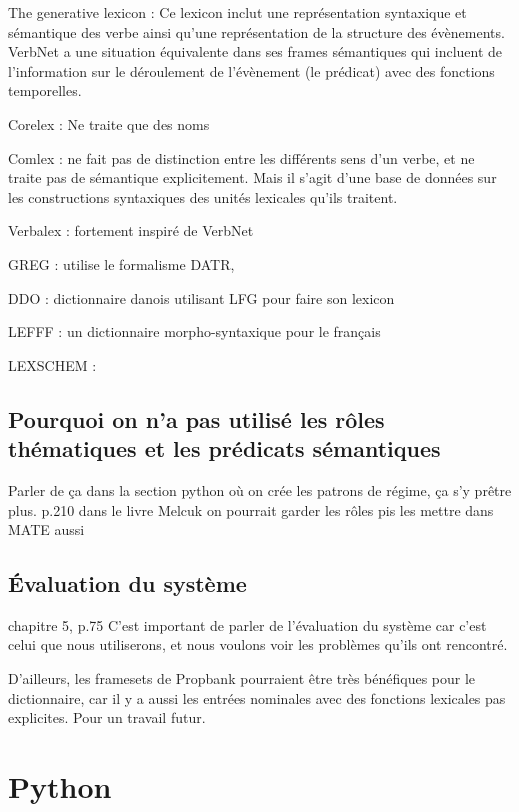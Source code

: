 The generative lexicon : Ce lexicon inclut une représentation syntaxique et sémantique des verbe ainsi qu'une représentation de la structure des évènements. VerbNet a une situation équivalente dans ses frames sémantiques qui incluent de l'information sur le déroulement de l'évènement (le prédicat) avec des fonctions temporelles.

Corelex : Ne traite que des noms

Comlex : ne fait pas de distinction entre les différents sens d'un verbe, et ne traite pas de sémantique explicitement. Mais il s'agit d'une base de données sur les constructions syntaxiques des unités lexicales qu'ils traitent.

Verbalex : fortement inspiré de VerbNet

GREG : utilise le formalisme DATR, 

DDO : dictionnaire danois utilisant LFG pour faire son lexicon

LEFFF : un dictionnaire morpho-syntaxique pour le français

LEXSCHEM :

\subsection{Pourquoi on n'a pas utilisé les rôles thématiques et les prédicats sémantiques}

Parler de ça dans la section python où on crée les patrons de régime, ça s'y prêtre plus.
p.210 dans le livre Melcuk
on pourrait garder les rôles pis les mettre dans MATE aussi

\subsection{Évaluation du système}
chapitre 5, p.75 C'est important de parler de l'évaluation du système car c'est celui que nous utiliserons, et nous voulons voir les problèmes qu'ils ont rencontré.

D'ailleurs, les framesets de Propbank pourraient être très bénéfiques pour le dictionnaire, car il y a aussi les entrées nominales avec des fonctions lexicales pas explicites. Pour un travail futur.


\section{Python}

